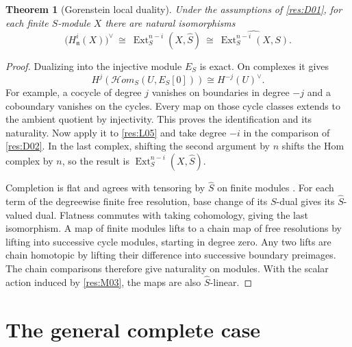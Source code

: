\documentclass[11pt,oneside,openany]{book}
\newtheorem{theorem}{Theorem}[chapter]
\theoremstyle{definition}
\theoremstyle{remark}
\begin{document}
\begin{theorem}[Gorenstein local duality]\label{res:D03}
Under the assumptions of \ref{res:D01}, for each finite
$S$-module $X$ there are natural isomorphisms
\[
 \bigl(H^i_{\mathfrak n}(X)\bigr)^\vee
   \ \cong\ \operatorname{Ext}^{n-i}_S(X,\widehat S)
   \ \cong\ \widehat{\operatorname{Ext}^{n-i}_S(X,S)} .
\]
\end{theorem}
\begin{proof}
Dualizing into the injective module $E_S$ is exact. On complexes it gives
\[
     H^j(\mathcal H om_S(U,E_S[0]))\cong H^{-j}(U)^\vee.
\]
For example, a cocycle of degree $j$ vanishes on boundaries in
degree $-j$ and a coboundary vanishes on the cycles. Every map on
those cycle classes extends to the ambient quotient by injectivity.
This proves the identification and its naturality. Now apply it to
\ref{res:L05} and take degree $-i$ in the comparison of
\ref{res:D02}. In the last complex, shifting the second argument
by $n$ shifts the Hom complex by $n$, so the result is
$\operatorname{Ext}^{n-i}_S(X,\widehat S)$.

Completion is flat and agrees with tensoring by $\widehat S$ on
finite modules \cite[ALG-05-C04-R03 and S01]{p103}. For each term
of the degreewise finite free resolution, base change of its
$S$-dual gives its $\widehat S$-valued dual. Flatness commutes with
taking cohomology, giving the last isomorphism. A map of finite
modules lifts to a chain map of free resolutions by lifting into
successive cycle modules, starting in degree zero. Any two lifts
are chain homotopic by lifting their difference into successive
boundary preimages. The chain comparisons therefore give
naturality on modules. With the scalar action induced by
\ref{res:M03}, the maps are also $\widehat S$-linear.
\end{proof}

\section{The general complete case}
\end{document}

